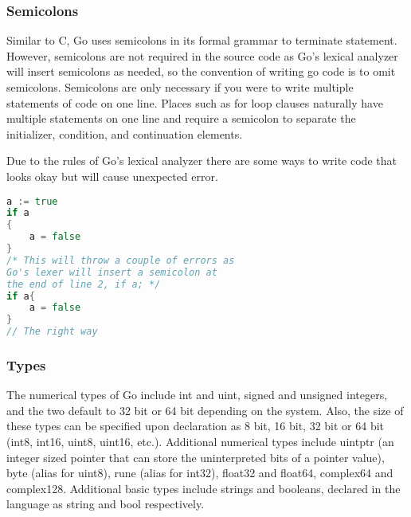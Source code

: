 \subsubsection{Semicolons}
Similar to C, Go uses semicolons in its formal grammar to terminate statement. However, semicolons are not required in the source code as Go's lexical analyzer will insert semicolons as needed, so the convention of writing go code is to omit semicolons. Semicolons are only necessary if you were to write multiple statements of code on one line. Places such as for loop clauses naturally have multiple statements on one line and require a semicolon to separate the initializer, condition, and continuation elements.\cite{website:go-lang-documentation}

Due to the rules of Go's lexical analyzer there are some ways to write code that looks okay but will cause unexpected error.
\begin{lstlisting}[language=Go]
a := true
if a
{
    a = false
}
/* This will throw a couple of errors as
Go's lexer will insert a semicolon at
the end of line 2, if a; */
if a{
    a = false
}
// The right way
\end{lstlisting}
\subsubsection{Types}
The numerical types of Go include int and uint, signed and unsigned integers, and the two default to 32 bit or 64 bit depending on the system. Also, the size of these types can be specified upon declaration as 8 bit, 16 bit, 32 bit or 64 bit (int8, int16, uint8, uint16, etc.). Additional numerical types include uintptr (an integer sized pointer that can store the uninterpreted bits of a pointer value), byte (alias for uint8), rune (alias for int32), float32 and float64, complex64 and complex128. Additional basic types include strings and booleans, declared in the language as string and bool respectively.

